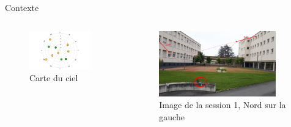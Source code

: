 \documentclass[xcolor=dvipsnames,envcountsect]{beamer}
\begin{document}
\begin{frame}{Contexte}
	\begin{columns}
		\begin{column}{0.5\textwidth}
			\begin{figure}
				\centering
				\includegraphics[width=0.9\textwidth]{./Figures/skyplot.jpg}
				\caption {Carte du ciel}
			\end{figure}
		\end{column}
		\begin{column}{0.5\textwidth}
			\begin{figure}
				\centering
				\includegraphics[width=0.9\textwidth]{./Figures/spot1.jpg}
				\caption {Image de la session 1, Nord sur la gauche}
			\end{figure}
		\end{column}

	\end{columns}
\end{frame}
\end{document}
